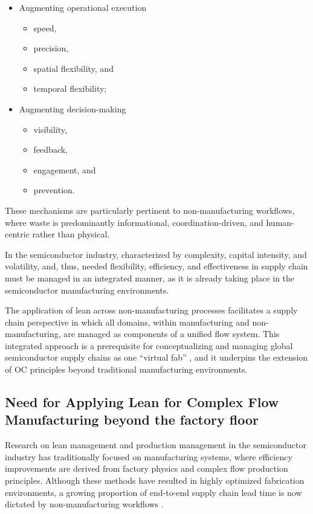 \documentclass[preprint,12pt,authoryear]{elsarticle}
\begin{document}
\begin{itemize}
  \item{Augmenting operational execution}
        \begin{itemize}
          \item speed,
          \item precision,
          \item spatial flexibility, and
          \item temporal flexibility;
        \end{itemize}
  \item{Augmenting decision-making}
        \begin{itemize}
          \item visibility,
          \item feedback,
          \item engagement, and
          \item prevention.
        \end{itemize}
\end{itemize}
%
These mechanisms are particularly pertinent to non-manufacturing workflows,
where waste is predominantly informational, coordination-driven, and
human-centric rather than physical.

In the semiconductor industry, characterized by complexity, capital intensity, and volatility, and, thus, needed flexibility, efficiency, and effectiveness in supply chain must be managed in an integrated manner, as it is already taking place in the semiconductor manufacturing environments.

The application of lean across non-manufacturing processes facilitates a supply chain perspective in which all domains, within manufacturing and non-manufacturing, are managed as components of a unified flow system. This integrated approach is a prerequisite for conceptualizing and managing global semiconductor supply chains as one ``virtual fab'' \citep{ehm2011}, and it underpins the extension of OC principles beyond traditional manufacturing environments.
    
\subsection{Need for Applying Lean for Complex Flow Manufacturing beyond the factory floor}\label{sec:Need for Applying Lean for Complex Flow Manufacturing beyond the factory floor}

Research on lean management and production management in the semiconductor industry has traditionally focused on manufacturing systems, where efficiency improvements are derived from factory physics and complex flow production principles. Although these methods have resulted in highly optimized fabrication environments, a growing proportion of end-to-end supply chain lead time is now dictated by non-manufacturing workflows \citep{LauterEhmReiner2025}.
\end{document}
